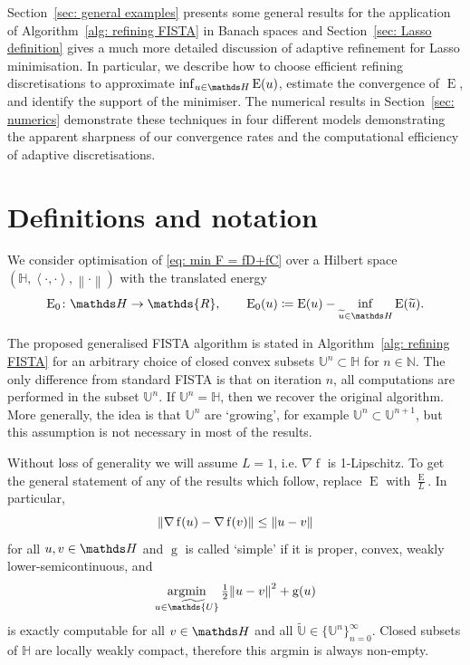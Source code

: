 \documentclass[smallextended]{svjour3}
\let\F\mathds\let\C\mathcal\newcommand{\R}{\F{R}}\newcommand{\A}{\tens{A}}
\newcommand{\norm}[1]{{\left\lVert #1 \right\rVert}}
\newcommand{\IP}[2]{\left\langle #1,#2 \right\rangle}
\newcommand{\op}[1]{\operatorname{#1}}
\newcommand{\1}{\F{1}}
\DeclareMathOperator*{\argmin}{argmin}
\newcommand{\Emin}[1][\var0]{\inf_{#1\in\F H}\op{E}(#1)}
\newcommand*{\var}[1]{%
	\IfEqCase{#1}{%
		{0}{u}%
		{1}{v}%
		{2}{w}%
	}[u#1]%
}
\begin{document}
	Section~\ref{sec: general examples} presents some general results for the application of Algorithm~\ref{alg: refining FISTA} in Banach spaces and Section~\ref{sec: Lasso definition} gives a much more detailed discussion of adaptive refinement for Lasso minimisation. In particular, we describe how to choose efficient refining discretisations to approximate $\Emin$, estimate the convergence of $\op{E}$, and identify the support of the minimiser. The numerical results in Section~\ref{sec: numerics} demonstrate these techniques in four different models demonstrating the apparent sharpness of our convergence rates and the computational efficiency of adaptive discretisations.
	
	
	\section{Definitions and notation}\label{sec: prelims}
	We consider optimisation of \eqref{eq: min F = fD+fC} over a Hilbert space $(\F H,\IP\cdot\cdot,\norm\cdot)$ with the translated energy
	\begin{equation}
		\op{E}_0\colon\F H\to \R,\qquad \op{E}_0(\var0) \coloneqq \op{E}(\var0)-\Emin[\tilde{\var0}].
	\end{equation}

	
	The proposed generalised FISTA algorithm is stated in Algorithm~\ref{alg: refining FISTA} for an arbitrary choice of closed convex subsets $\F{U}^n\subset \F H$ for $n\in\F N$. The only difference from standard FISTA is that on iteration $n$, all computations are performed in the subset $\F{U}^n$. If $\F{U}^n=\F H$, then we recover the original algorithm. More generally, the idea is that $\F{U}^n$ are `growing', for example $\F{U}^n\subset\F{U}^{n+1}$, but this assumption is not necessary in most of the results.
	
	Without loss of generality we will assume $L=1$, i.e. $\nabla\op{f}$ is 1-Lipschitz. To get the general statement of any of the results which follow, replace $\op{E}$ with $\frac{\op{E}}{L}$. In particular,
	\begin{equation}
		\norm{\nabla\op{f}(\var0)- \nabla\op{f}(\var1)} \leq \norm{\var0-\var1}
	\end{equation}
	for all $\var0,\var1\in\F H$ and $\op{g}$ is called `simple' if it is proper, convex, weakly lower-semicontinuous, and
	\begin{equation}
		\argmin_{\var0\in\tilde{\F{U}}}\tfrac12\norm{\var0-\var1}^2 + \op{g}(\var0)
	\end{equation}
	is exactly computable for all $\var1\in\F H$ and all $\tilde{\F{U}}\in\{\F{U}^n\}_{n=0}^\infty$. Closed subsets of $\F H$ are locally weakly compact, therefore this argmin is always non-empty.
	
\end{document}
